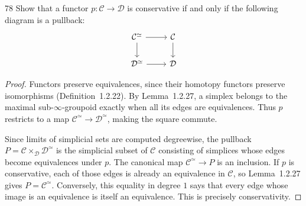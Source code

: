 \begin{exercise}{78}
Show that a functor $p\colon\mathcal C\to\mathcal D$ is conservative if and only if the
following diagram is a pullback:
\[
\begin{tikzcd}
 \mathcal C^{\simeq} \arrow[r] \arrow[d] & \mathcal C \arrow[d] \\
 \mathcal D^{\simeq} \arrow[r] & \mathcal D
\end{tikzcd}
\]

\begin{proof}
Functors preserve equivalences, since their homotopy functors
preserve isomorphisms (Definition~1.2.22).
By Lemma~1.2.27, a simplex belongs to the maximal
sub-$\infty$-groupoid exactly when all its edges are equivalences.
Thus $p$ restricts to a map
$\mathcal C^{\simeq}\to\mathcal D^{\simeq}$, making the square
commute.

Since limits of simplicial sets are computed degreewise,
the pullback $P=\mathcal C\times_{\mathcal D}\mathcal D^{\simeq}$
is the simplicial subset of $\mathcal C$ consisting of simplices
whose edges become equivalences under $p$.
The canonical map $\mathcal C^{\simeq}\to P$ is an inclusion.
If $p$ is conservative, each of those edges is already an
equivalence in $\mathcal C$, so Lemma~1.2.27 gives
$P=\mathcal C^{\simeq}$.
Conversely, this equality in degree $1$ says that every edge
whose image is an equivalence is itself an equivalence.
This is precisely conservativity.
\end{proof}
\end{exercise}
